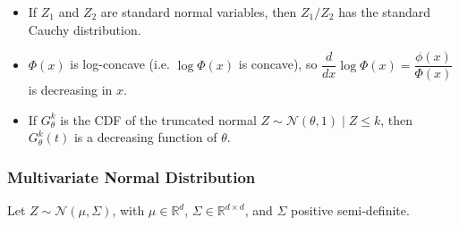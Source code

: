 \documentclass[twoside]{article}
\newcommand\bbR{\mathbb{R}}
\newcommand\calN{\mathcal{N}}
\newcommand\Sg{\Sigma}
\def\t{\theta}
\begin{document}
\begin{itemize}
\item If $Z_1$ and $Z_2$ are standard normal variables, then $Z_1/Z_2$ has the standard Cauchy distribution.

\item $\Phi(x)$ is log-concave (i.e. $\log \Phi(x)$ is concave), so $\dfrac{d}{dx} \log \Phi(x) = \dfrac{\phi(x)}{\Phi(x)}$ is decreasing in $x$.

\item If $G_\t^k$ is the CDF of the truncated normal $Z \sim \calN(\t, 1) \mid Z \leq k$, then $G_\t^k(t)$ is a decreasing function of $\t$.
\end{itemize}

\subsubsection{Multivariate Normal Distribution}
Let $Z \sim \calN(\mu, \Sg)$, with $\mu \in \bbR^d$, $\Sg \in \bbR^{d \times d}$, and $\Sg$ positive semi-definite.
\end{document}

